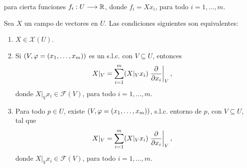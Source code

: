 \documentclass[cursovd_portada.tex]{subfiles}
\begin{document}
para cierta funciones $f_i:U\longrightarrow\mathbb{R}$, donde $f_i=Xx_i$, para todo
$i=1,\dots ,m$.
\begin{prop}
Sea $X$ un campo de vectores en $U$. Las condiciones siguientes son equivalentes:
\begin{enumerate}
\item $X\in\mathcal{X}(U)$. \item Si $(V,\varphi=(x_1,\dots ,x_m))$ es
un s.l.c. con $V\subseteq U$, entonces
$$X|_V=\sum_{i=1}^m(X|_Vx_i)\left.\displaystyle{\frac{\partial}{\partial x_i}}\right\vert_V,$$
donde $X|_Vx_i\in\mathcal{F}(V)$, para todo $i=1,\dots ,m$. \item
Para todo $p\in U$, existe $(V,\varphi=(x_1,\dots ,x_m))$, s.l.c.
entorno de $p$, con $V\subseteq U$, tal que
$$X|_V=\sum_{i=1}^m(X|_Vx_i)\left.\displaystyle{\frac{\partial}{\partial x_i}}\right\vert_V,$$
donde $X|_Vx_i\in\mathcal{F}(V)$, para todo $i=1,\dots ,m$.
\end{enumerate}
\end{prop}

\
\end{document}
